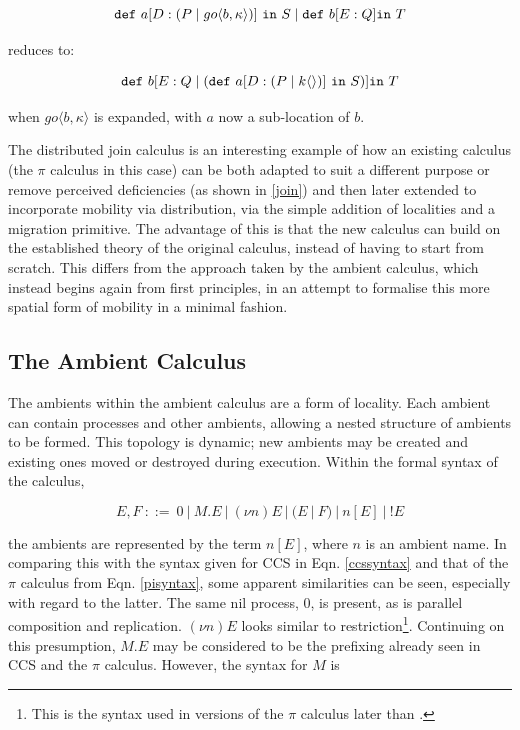 \begin{equation}
\mathtt{def}\ a[D:(P \;|\; go \langle b, \kappa \rangle)]\ \mathtt{in}\ S
\;|\; \mathtt{def}\ b[E : Q] \mathtt{in}\ T
\end{equation}

\noindent reduces to:

\begin{equation}
\mathtt{def}\ b[E : Q \pc (\mathtt{def}\ a[D:(P \pc k\langle \rangle)]\ \mathtt{in}\ S)] \mathtt{in}\ T
\end{equation}

\noindent when $go \langle b, \kappa \rangle$ is expanded, with $a$
now a sub-location of $b$.

The distributed join calculus is an interesting example of how an
existing calculus (the $\pi$ calculus in this case) can be both
adapted to suit a different purpose or remove perceived deficiencies
(as shown in \ref{join}) and then later extended to incorporate
mobility via distribution, via the simple addition of localities and a
migration primitive.  The advantage of this is that the new calculus
can build on the established theory of the original calculus, instead
of having to start from scratch.  This differs from the approach taken
by the ambient calculus, which instead begins again from first
principles, in an attempt to formalise this more spatial form of
mobility in a minimal fashion.

\subsection{The Ambient Calculus}
\label{ambientcalculus}

The ambients within the ambient calculus \cite*{amb} are a form of
locality.  Each ambient can contain processes and other ambients,
allowing a nested structure of ambients to be formed.  This topology
is dynamic; new ambients may be created and existing ones moved or
destroyed during execution.  Within the formal syntax of the calculus,

\begin{equation}
\label{ambsyntax}
  E, F\ ::=\ 
  0\ |\ 
  M.E\ |\ 
  (\nu n)E\ |\ 
  (E\ |\ F)\ |\ 
  n[E]\ |\ 
  !E
\end{equation}

\noindent the ambients are represented by the term $n[E]$, where $n$
is an ambient name.  In comparing this with the syntax given for CCS
in Eqn. \ref{ccssyntax} and that of the $\pi$ calculus from Eqn.
\ref{pisyntax}, some apparent similarities can be seen, especially
with regard to the latter.  The same nil process, $0$, is present, as
is parallel composition and replication.  $(\nu n)E$ looks similar to
restriction\footnote{This is the syntax used in versions of the $\pi$
  calculus later than \cite{funcproc}.}.  Continuing on this
presumption, $M.E$ may be considered to be the prefixing already seen
in CCS and the $\pi$ calculus.  However, the syntax for $M$ is

